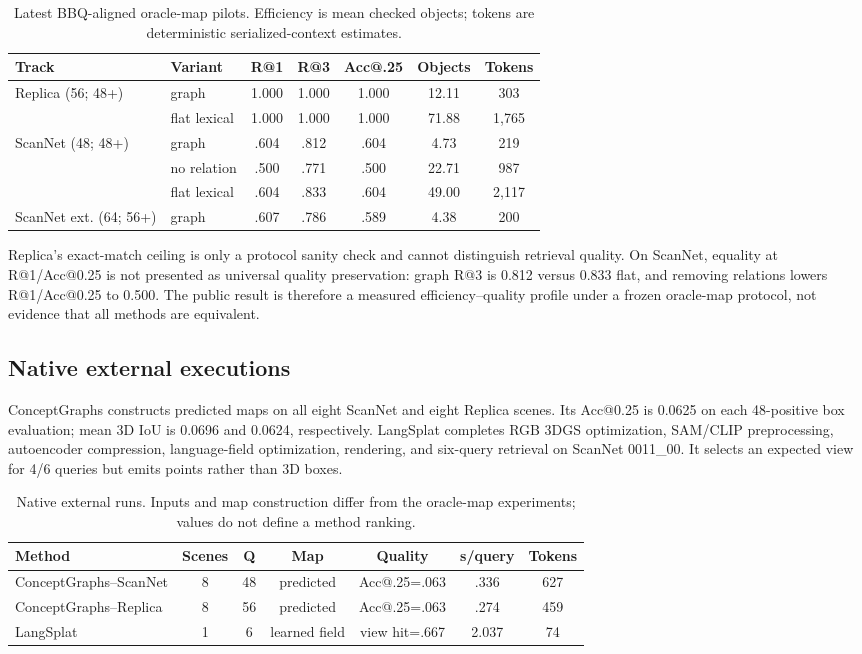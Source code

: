 \documentclass[runningheads]{llncs}
\begin{document}
\begin{table}[H]
\centering
\caption{Latest BBQ-aligned oracle-map pilots. Efficiency is mean checked
objects; tokens are deterministic serialized-context estimates.}
\label{tab:public}
\small
\begin{tabular}{llccccc}
\toprule
Track & Variant & R@1 & R@3 & Acc@.25 & Objects & Tokens \\
\midrule
\multirow{2}{*}{Replica (56; 48+)}
 & graph & 1.000 & 1.000 & 1.000 & 12.11 & 303 \\
 & flat lexical & 1.000 & 1.000 & 1.000 & 71.88 & 1,765 \\
\midrule
\multirow{3}{*}{ScanNet (48; 48+)}
 & graph & .604 & .812 & .604 & 4.73 & 219 \\
 & no relation & .500 & .771 & .500 & 22.71 & 987 \\
 & flat lexical & .604 & .833 & .604 & 49.00 & 2,117 \\
\midrule
ScanNet ext. (64; 56+) & graph & .607 & .786 & .589 & 4.38 & 200 \\
\bottomrule
\end{tabular}
\end{table}

Replica's exact-match ceiling is only a protocol sanity check and cannot
distinguish retrieval quality. On ScanNet, equality at R@1/Acc@0.25 is not
presented as universal quality preservation: graph R@3 is 0.812 versus 0.833
flat, and removing relations lowers R@1/Acc@0.25 to 0.500. The public result is
therefore a measured efficiency--quality profile under a frozen oracle-map
protocol, not evidence that all methods are equivalent.

\subsection{Native external executions}
ConceptGraphs constructs predicted maps on all eight ScanNet and eight Replica
scenes. Its Acc@0.25 is 0.0625 on each 48-positive box evaluation; mean 3D IoU
is 0.0696 and 0.0624, respectively. LangSplat completes RGB 3DGS
optimization, SAM/CLIP preprocessing, autoencoder compression, language-field
optimization, rendering, and six-query retrieval on ScanNet 0011\_00. It
selects an expected view for 4/6 queries but emits points rather than 3D boxes.

\begin{table}[H]
\centering
\caption{Native external runs. Inputs and map construction differ from the
oracle-map experiments; values do not define a method ranking.}
\label{tab:external}
\footnotesize
\begin{tabular}{lcccccc}
\toprule
Method & Scenes & Q & Map & Quality & s/query & Tokens \\
\midrule
ConceptGraphs--ScanNet & 8 & 48 & predicted & Acc@.25=.063 & .336 & 627 \\
ConceptGraphs--Replica & 8 & 56 & predicted & Acc@.25=.063 & .274 & 459 \\
LangSplat & 1 & 6 & learned field & view hit=.667 & 2.037 & 74 \\
\bottomrule
\end{tabular}
\end{table}
\end{document}

